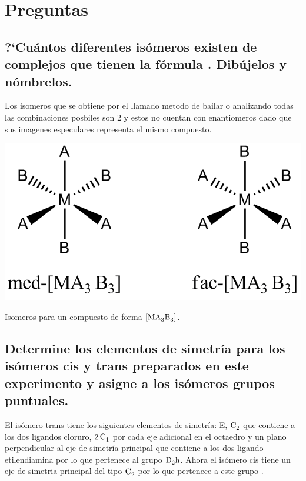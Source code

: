 \documentclass[fleqn,10pt]{SelfArx} %
\begin{document}
	\section{Preguntas}
	\subsection[Diferentes is\'omeros]{?`Cu\'antos diferentes is\'omeros existen de complejos que tienen la f\'ormula . Dib\'ujelos y n\'ombrelos.}
	Los isomeros que se obtiene por el llamado metodo de bailar o analizando todas las combinaciones posbiles son 2 y estos no cuentan con enantiomeros  dado que sus imagenes especulares representa el mismo compuesto.
	\begin{scheme}[h]
	    \centering
	    \includegraphics[width = 0.65 \linewidth]{images/isomeros.png}
	    \caption{Isomeros para un compuesto de forma $\ce{[MA_{3}B_{3}]}$.}
	    \label{sch: isomemeros}
	\end{scheme}
	
	\subsection[Elementos de simetr\'ia]{Determine los elementos de simetr\'ia para los is\'omeros cis y trans preparados en este experimento y asigne a los is\'omeros grupos puntuales.}
	El isómero trans tiene los siguientes elementos de simetría: E, $\ce{C_{2}}$ que contiene a los dos ligandos cloruro, $\ce{2C_{1}}$ por cada eje adicional en el octaedro y un plano perpendicular al eje de simetría principal que contiene a los dos ligando etilendiamina por lo que pertenece al grupo $\ce{D2h}$. Ahora el isómero cis tiene un eje de simetria principal del tipo $\ce{C_{2}}$ por lo que pertenece a este grupo \cite{iso}.
\end{document}
